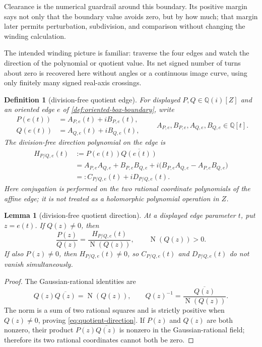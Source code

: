 \documentclass[11pt]{article}
\newtheorem{lemma}[theorem]{Lemma}
\newtheorem{definition}[theorem]{Definition}
\newcommand{\Qi}{\mathbb{Q}(i)}
\newcommand{\Q}{\mathbb{Q}}
\newcommand{\Norm}[1]{\operatorname{N}\!\left(#1\right)}
\begin{document}
Clearance is the numerical guardrail around this boundary.  Its positive
margin says not only that the boundary value avoids zero, but by how much;
that margin later permits perturbation, subdivision, and comparison without
changing the winding calculation.

The intended winding picture is familiar: traverse the four edges and watch
the direction of the polynomial or quotient value.  Its net signed number of
turns about zero is recovered here without angles or a continuous image
curve, using only finitely many signed real-axis crossings.

\begin{definition}[division-free quotient edge]
\label{def:division-free-quotient-edge}
For displayed $P,Q\in\Qi[Z]$ and an oriented edge $e$ of
\cref{def:oriented-box-boundary}, write
\[
 \begin{aligned}
 P(e(t))&=A_{P,e}(t)+iB_{P,e}(t),\\
 Q(e(t))&=A_{Q,e}(t)+iB_{Q,e}(t),
 \end{aligned}
 \qquad A_{P,e},B_{P,e},A_{Q,e},B_{Q,e}\in\Q[t].
\]
The division-free direction polynomial on the edge is
\[
 \begin{aligned}
 H_{P/Q,e}(t)
   &:=P(e(t))\overline{Q(e(t))}\\
   &=A_{P,e}A_{Q,e}+B_{P,e}B_{Q,e}
     +i\bigl(B_{P,e}A_{Q,e}-A_{P,e}B_{Q,e}\bigr)\\
   &=:C_{P/Q,e}(t)+iD_{P/Q,e}(t).
 \end{aligned}
\]
Here conjugation is performed on the two rational coordinate polynomials
of the affine edge; it is not treated as a holomorphic polynomial operation
in $Z$.
\end{definition}

\begin{lemma}[division-free quotient direction]
\label{lem:quotient-direction}
At a displayed edge parameter $t$, put $z=e(t)$.  If $Q(z)\ne0$, then
\begin{equation}
\label{eq:quotient-direction}
             \frac{P(z)}{Q(z)}
             =\frac{H_{P/Q,e}(t)}{\Norm{Q(z)}},
             \qquad \Norm{Q(z)}>0.
\end{equation}
If also $P(z)\ne0$, then $H_{P/Q,e}(t)\ne0$, so
$C_{P/Q,e}(t)$ and $D_{P/Q,e}(t)$ do not vanish simultaneously.
\end{lemma}

\begin{proof}
The Gaussian-rational identities are
\[
 Q(z)\overline{Q(z)}=\Norm{Q(z)},\qquad
 Q(z)^{-1}=\frac{\overline{Q(z)}}{\Norm{Q(z)}}.
\]
The norm is a sum of two rational squares and is strictly positive when
$Q(z)\ne0$, proving
\eqref{eq:quotient-direction}.  If $P(z)$ and $Q(z)$ are both nonzero, their
product $P(z)\overline{Q(z)}$ is nonzero in the Gaussian-rational field;
therefore its two rational coordinates cannot both be zero.
\end{proof}
\end{document}
